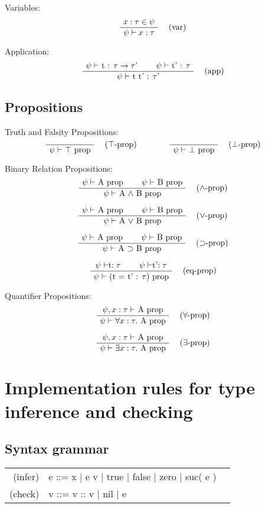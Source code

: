 \documentclass[twoside,a4paper]{article}
\begin{document}
Variables:
\[
\AxiomC{$x : \tau \in \psi$}
\RightLabel{\quad (var)}
\UnaryInfC{$\psi \vdash x : \tau$}
\DisplayProof
\]

Application:
\[
\AxiomC{$\psi \vdash$ t : $\tau \rightarrow \tau$'}
\AxiomC{$\psi \vdash$ t' : $\tau$}
\RightLabel{\quad (app)}
\BinaryInfC{$\psi \vdash$ t t' : $\tau$'}
\DisplayProof
\]

\subsection{Propositions}
Truth and Falsity Propositions:
\[
\AxiomC{}
\RightLabel{\quad ($\top$-prop)}
\UnaryInfC{$\psi \vdash$ $\top$  prop}
\DisplayProof
\qquad
\qquad
\AxiomC{}
\RightLabel{\quad ($\bot$-prop)}
\UnaryInfC{$\psi \vdash$ $\bot$  prop}
\DisplayProof
\]

Binary Relation Propositions:
\[
\AxiomC{$\psi \vdash$ A prop}
\AxiomC{$\psi \vdash$ B prop}
\RightLabel{\quad ($\wedge$-prop)}
\BinaryInfC{$\psi \vdash$ A $\wedge$ B prop}
\DisplayProof
\]

\[
\AxiomC{$\psi \vdash$ A prop}
\AxiomC{$\psi \vdash$ B prop}
\RightLabel{\quad ($\vee$-prop)}
\BinaryInfC{$\psi \vdash$ A $\vee$ B prop}
\DisplayProof
\]

\[
\AxiomC{$\psi \vdash$ A prop}
\AxiomC{$\psi \vdash$ B prop}
\RightLabel{\quad ($\supset$-prop)}
\BinaryInfC{$\psi \vdash$ A $\supset$ B prop}
\DisplayProof
\]

\[
\AxiomC{$\psi \vdash $t$ : \tau$}
\AxiomC{$\psi \vdash $t'$ : \tau$}
\RightLabel{\quad (eq-prop)}
\BinaryInfC{$\psi \vdash$ (t = t' : $\tau$) prop}
\DisplayProof
\]

Quantifier Propositions:
\[
\AxiomC{$\psi , x : \tau \vdash$ A prop}
\RightLabel{\quad ($\forall$-prop)}
\UnaryInfC{$\psi \vdash \forall x : \tau .$ A prop}
\DisplayProof
\]

\[
\AxiomC{$\psi , x : \tau \vdash$ A prop}
\RightLabel{\quad ($\exists$-prop)}
\UnaryInfC{$\psi \vdash \exists x : \tau .$ A prop}
\DisplayProof
\]

\section{Implementation rules for type inference and checking}

\subsection{Syntax grammar}
\begin{center}
\begin{tabular}{rll}
(infer)& e ::= x 
| e v | true | false | zero | suc( e )
\\
(check)& v ::= v :: v  | nil | e
\end{tabular}
\end{center}
\end{document}
